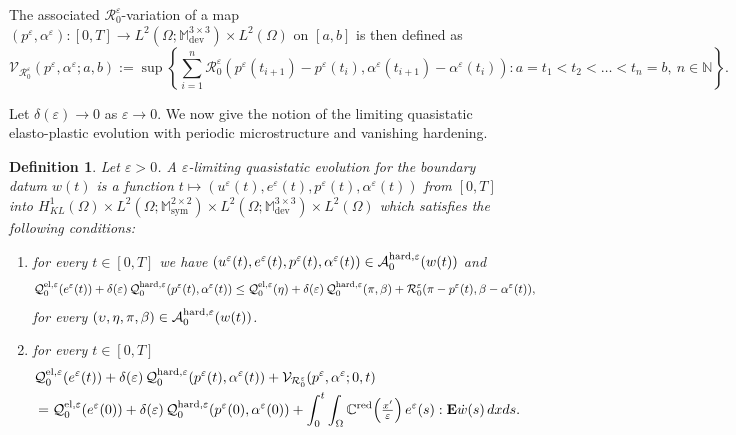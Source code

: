 \documentclass[reqno,10pt]{amsart}
\numberwithin{equation}{section}
\newtheorem{definition}[theorem]{Definition}
\theoremstyle{remark}
\newcommand{\calA}{\mathcal{A}}
\newcommand{\C}{\mathbb{C}}
\newcommand{\M}{\mathbb{M}}
\newcommand{\N}{\mathbb{N}}
\newcommand{\calQ}{\mathcal{Q}}
\newcommand{\calR}{\mathcal{R}}
\newcommand{\calV}{\mathcal{V}}
\DeclareMathOperator{\dev}{dev}
\DeclareMathOperator{\sym}{sym}
\newcommand{\eps}{\varepsilon}
\newcommand{\E}{{\bf E}}
\newcommand{\red}[1]{#1^{\rm red}}
\begin{document}
The associated $\calR^{\eps}_{0}$-variation of a map 
$(p^\eps, \alpha^\eps) : [0, T] \to L^2(\Omega;\M^{3 \times 3}_{\dev}) \times L^2(\Omega)$ on $[a,b]$ is then defined as
\begin{equation*}
	\calV_{\calR^{\eps}_{0}}(p^\eps, \alpha^\eps; a, b) := \sup\left\{ \sum_{i = 1}^{n} \calR^{\eps}_{0}\!\left(p^\eps(t_{i+1}) - p^\eps(t_i), \alpha^\eps(t_{i+1}) - \alpha^\eps(t_i)\right) : a = t_1 < t_2 < \ldots < t_n = b,\ n \in \N \right\}.
\end{equation*}

Let $\delta(\eps) \to 0$ as $\eps \to 0$.
We now give the notion of the limiting quasistatic elasto-plastic evolution with periodic microstructure and vanishing hardening.

\begin{definition} \label{eps-limiting quasistatic evolution}
Let $\eps > 0$. 
A \emph{$\eps$-limiting quasistatic evolution} for the boundary datum $w(t)$ is a function $t \mapsto (u^\eps(t), e^\eps(t), p^\eps(t), \alpha^\eps(t))$ from $[0, T]$ into $H^1_{KL}(\Omega) \times L^2(\Omega;\M^{2 \times 2}_{\sym}) \times L^2(\Omega;\M^{3 \times 3}_{\dev}) \times L^2(\Omega)$ which satisfies the following conditions:
\begin{enumerate}[label=(qs\arabic*)$^{\eps}_{0}$]
	\item \label{eps-0-qs S} for every $t \in [0, T]$ we have $(u^\eps(t), e^\eps(t), p^\eps(t), \alpha^\eps(t)) \in \calA_{0}^{\rm hard,\eps}(w(t))$ and
	\begin{align*}
		\calQ^{\rm el,\eps}_{0}(e^\eps(t)) + \delta(\eps)\,\calQ^{\rm hard,\eps}_{0}(p^\eps(t), \alpha^\eps(t)) 
		\leq \calQ^{\rm el,\eps}_{0}(\eta) + \delta(\eps)\,\calQ^{\rm hard,\eps}_{0}(\pi, \beta) + \calR^{\eps}_{0}(\pi - p^\eps(t), \beta - \alpha^\eps(t)) 
		,
	\end{align*}
	for every $(\upsilon, \eta, \pi, \beta) \in \calA_{0}^{\rm hard,\eps}(w(t))$.
	\item \label{eps-0-qs E} %
	for every $t \in [0, T]$
	\begin{align*}
		& \calQ^{\rm el,\eps}_{0}(e^\eps(t)) + \delta(\eps)\,\calQ^{\rm hard,\eps}_{0}(p^\eps(t), \alpha^\eps(t)) 
		+ \calV_{\calR^{\eps}_{0}}(p^\eps, \alpha^\eps; 0, t) 
		\\& = \calQ^{\rm el,\eps}_{0}(e^\eps(0)) + \delta(\eps)\,\calQ^{\rm hard,\eps}_{0}(p^\eps(0), \alpha^\eps(0)) 
		+ \int_0^t \int_{\Omega} \red{\C}\!\left(\tfrac{x'}{\eps}\right) e^\eps(s) : {\E}\dot{w}(s) \,dx ds.
	\end{align*}
\end{enumerate}
\end{definition}
\end{document}
